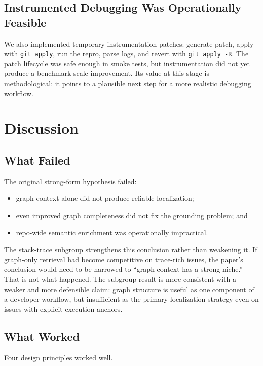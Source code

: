 \documentclass[11pt]{article}
\begin{document}
\subsection{Instrumented Debugging Was Operationally Feasible}

We also implemented temporary instrumentation patches: generate patch, apply with \texttt{git apply}, run the repro, parse logs, and revert with \texttt{git apply -R}. The patch lifecycle was safe enough in smoke tests, but instrumentation did not yet produce a benchmark-scale improvement. Its value at this stage is methodological: it points to a plausible next step for a more realistic debugging workflow.

\section{Discussion}

\subsection{What Failed}

The original strong-form hypothesis failed:

\begin{itemize}
\item graph context alone did not produce reliable localization;
\item even improved graph completeness did not fix the grounding problem; and
\item repo-wide semantic enrichment was operationally impractical.
\end{itemize}

The stack-trace subgroup strengthens this conclusion rather than weakening it. If graph-only retrieval had become competitive on trace-rich issues, the paper’s conclusion would need to be narrowed to ``graph context has a strong niche.'' That is not what happened. The subgroup result is more consistent with a weaker and more defensible claim: graph structure is useful as one component of a developer workflow, but insufficient as the primary localization strategy even on issues with explicit execution anchors.

\subsection{What Worked}

Four design principles worked well.
\end{document}
